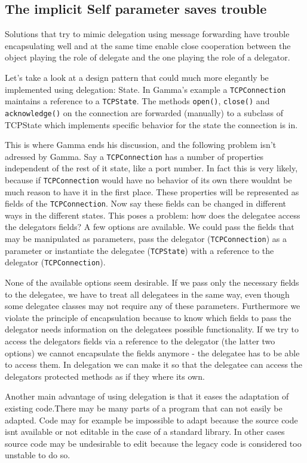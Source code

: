 \documentclass[a4paper,12pt]{book}
\begin{document}
\subsection*{The implicit Self parameter saves trouble}
Solutions that try to mimic delegation using message forwarding have trouble encapsulating well and at the same time enable close cooperation between the object playing the role of delegate and the one playing the role of a delegator.

Let's take a look at a design pattern that could much more elegantly be implemented using delegation: State. In Gamma's example a \verb|TCPConnection| maintains a reference to a \verb|TCPState|. The methods \verb|open()|, \verb|close()| and \verb|acknowledge()| on the connection are forwarded (manually) to a subclass of TCPState which implements specific behavior for the state the connection is in.

This is where Gamma ends his discussion, and the following problem isn't adressed by Gamma. Say a \verb|TCPConnection| has a number of properties independent of the rest of it state, like a port number. In fact this is very likely, because if \verb|TCPConnection| would have no behavior of its own there wouldnt be much reason to have it in the first place. These properties will be represented as fields of the \verb|TCPConnection|. Now say these fields can be changed in different ways in the different states. This poses a problem: how does the delegatee access the delegators fields? A few options are available. We could pass the fields that may be manipulated as parameters, pass the delegator (\verb|TCPConnection|) as a parameter or instantiate the delegatee (\verb|TCPState|) with a reference to the delegator (\verb|TCPConnection|).

None of the available options seem desirable. If we pass only the necessary fields to the delegatee, we have to treat all delegatees in the same way, even though some delegatee classes may not require any of these parameters. Furthermore we violate the principle of encapsulation because to know which fields to pass the delegator needs information on the delegatees possible functionality. If we try to access the delegators fields via a reference to the delegator (the latter two options) we cannot encapsulate the fields anymore - the delegatee has to be able to access them. In delegation we can make it so that the delegatee can access the delegators protected methods as if they where its own.

Another main advantage of using delegation is that it eases the adaptation of existing code.There may be many parts of a program that can not easily be adapted. Code may for example be impossible to adapt because the source code isnt available or not editable in the case of a standard library. In other cases source code may be undesirable to edit because the legacy code is considered too unstable to do so.
\end{document}
